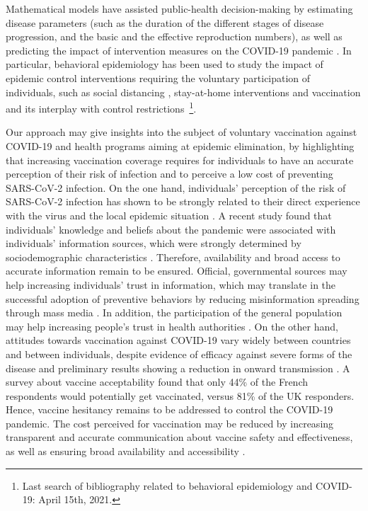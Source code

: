 Mathematical models have assisted public-health decision-making by estimating disease parameters (such as the duration of the different stages of disease progression, and the basic and the effective reproduction numbers), as well as predicting the impact of intervention measures on the COVID-19 pandemic \cite[]{Xiang2021}. In particular, behavioral epidemiology has been used to study the impact of epidemic control interventions requiring the voluntary participation of individuals, such as social distancing \cite[]{Gupta2020}, stay-at-home interventions \cite[]{Kabir2020} and vaccination \cite[]{Choi2020} and its interplay with control restrictions~\cite[]{Jentsch2021}\footnote{Last search of bibliography related to behavioral epidemiology and COVID-19: April 15th, 2021.}. 

Our approach may give insights into the subject of voluntary vaccination against COVID-19 and health programs aiming at epidemic elimination, by highlighting that increasing vaccination coverage requires for individuals to have an accurate perception of their risk of infection and to perceive a low cost of preventing SARS-CoV-2 infection. On the one hand, individuals' perception of the risk of SARS-CoV-2 infection has shown to be strongly related to their direct experience with the virus and the local epidemic situation \cite[]{Mansilla2020,Elharake2021}. A recent study found that individuals' knowledge and beliefs about the pandemic were associated with individuals' information sources, which were strongly determined by sociodemographic characteristics \cite[]{Ali2020}. Therefore, availability and broad access to accurate information remain to be ensured. Official, governmental sources may help increasing individuals' trust in information, which may translate in the successful adoption of preventive behaviors \cite[]{Lim2020} by reducing misinformation spreading through mass media \cite[]{Lorenz2020}. In addition, the participation of the general population may help increasing people's trust in health authorities \cite[]{WHO_InfodemicTraining}. On the other hand, attitudes towards vaccination against COVID-19 vary widely between countries and between individuals, despite evidence of efficacy against severe forms of the disease and preliminary results showing a reduction in onward transmission \cite[]{WHO_CovidVaccines}. A survey about vaccine acceptability \cite[]{Wuoters2021} found that only 44\% of the French respondents would potentially get vaccinated, versus 81\% of the UK responders. Hence, vaccine hesitancy remains to be addressed to control the COVID-19 pandemic. The cost perceived for vaccination may be reduced by increasing transparent and accurate communication about vaccine safety and effectiveness, as well as ensuring broad availability and accessibility \cite[]{Wuoters2021}.

